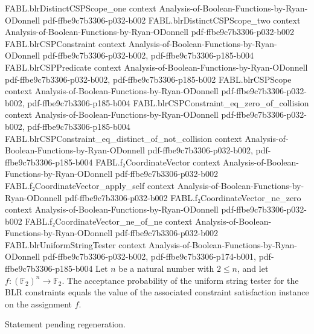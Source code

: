 \begin{theorem}
\proofstep
  {FABL.blrDistinctCSPScope_one}
  {context}
  {Analysis-of-Boolean-Functions-by-Ryan-ODonnell}
  {pdf-ffbe9c7b3306-p032-b002}
\proofstep
  {FABL.blrDistinctCSPScope_two}
  {context}
  {Analysis-of-Boolean-Functions-by-Ryan-ODonnell}
  {pdf-ffbe9c7b3306-p032-b002}
\proofstep
  {FABL.blrCSPConstraint}
  {context}
  {Analysis-of-Boolean-Functions-by-Ryan-ODonnell}
  {pdf-ffbe9c7b3306-p032-b002,
    pdf-ffbe9c7b3306-p185-b004}
\proofstep
  {FABL.blrCSPPredicate}
  {context}
  {Analysis-of-Boolean-Functions-by-Ryan-ODonnell}
  {pdf-ffbe9c7b3306-p032-b002,
    pdf-ffbe9c7b3306-p185-b002}
\proofstep
  {FABL.blrCSPScope}
  {context}
  {Analysis-of-Boolean-Functions-by-Ryan-ODonnell}
  {pdf-ffbe9c7b3306-p032-b002,
    pdf-ffbe9c7b3306-p185-b004}
\proofstep
  {FABL.blrCSPConstraint_eq_zero_of_collision}
  {context}
  {Analysis-of-Boolean-Functions-by-Ryan-ODonnell}
  {pdf-ffbe9c7b3306-p032-b002,
    pdf-ffbe9c7b3306-p185-b004}
\proofstep
  {FABL.blrCSPConstraint_eq_distinct_of_not_collision}
  {context}
  {Analysis-of-Boolean-Functions-by-Ryan-ODonnell}
  {pdf-ffbe9c7b3306-p032-b002,
    pdf-ffbe9c7b3306-p185-b004}
\proofstep
  {FABL.f₂CoordinateVector}
  {context}
  {Analysis-of-Boolean-Functions-by-Ryan-ODonnell}
  {pdf-ffbe9c7b3306-p032-b002}
\proofstep
  {FABL.f₂CoordinateVector_apply_self}
  {context}
  {Analysis-of-Boolean-Functions-by-Ryan-ODonnell}
  {pdf-ffbe9c7b3306-p032-b002}
\proofstep
  {FABL.f₂CoordinateVector_ne_zero}
  {context}
  {Analysis-of-Boolean-Functions-by-Ryan-ODonnell}
  {pdf-ffbe9c7b3306-p032-b002}
\proofstep
  {FABL.f₂CoordinateVector_ne_of_ne}
  {context}
  {Analysis-of-Boolean-Functions-by-Ryan-ODonnell}
  {pdf-ffbe9c7b3306-p032-b002}
\proofstep
  {FABL.blrUniformStringTester}
  {context}
  {Analysis-of-Boolean-Functions-by-Ryan-ODonnell}
  {pdf-ffbe9c7b3306-p032-b002,
    pdf-ffbe9c7b3306-p174-b001,
    pdf-ffbe9c7b3306-p185-b004}
Let $n$ be a natural number with $2\le n$, and let $f:(\mathbb F_2)^n\to\mathbb F_2$.
The acceptance probability of the uniform string tester for the BLR constraints equals
the value of the associated constraint satisfaction instance on the assignment $f$.
\end{theorem}

\begin{theorem}
\label{FABL.blrUniformStringTester_acceptance_eq_expect}
\leanok
{}
Statement pending regeneration.
\end{theorem}
